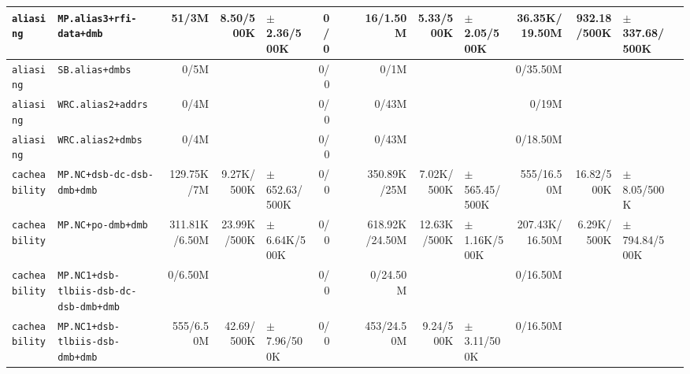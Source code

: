 \begin{tabular}{l l  | r r l | r r l | r r l | r r l l}
       \verb|aliasing| &                              \verb|MP.alias3+rfi-data+dmb| &          51/3M &             8.50/500K &   $\pm$ 2.36/500K &            0/0 &                       &  &       16/1.50M &             5.33/500K &   $\pm$ 2.05/500K &  36.35K/19.50M &           932.18/500K & $\pm$ 337.68/500K & \\ \hline 
       \verb|aliasing| &                                       \verb|SB.alias+dmbs| &           0/5M &                       &                   &            0/0 &                       &  &           0/1M &                       &                   &       0/35.50M &                       &                   & \\ \hline 
       \verb|aliasing| &                                    \verb|WRC.alias2+addrs| &           0/4M &                       &                   &            0/0 &                       &  &          0/43M &                       &                   &          0/19M &                       &                   & \\ \hline 
       \verb|aliasing| &                                     \verb|WRC.alias2+dmbs| &           0/4M &                       &                   &            0/0 &                       &  &          0/43M &                       &                   &       0/18.50M &                       &                   & \\ \hline 
   \verb|cacheability| &                            \verb|MP.NC+dsb-dc-dsb-dmb+dmb| &     129.75K/7M &            9.27K/500K & $\pm$ 652.63/500K &            0/0 &                       &  &    350.89K/25M &            7.02K/500K & $\pm$ 565.45/500K &     555/16.50M &            16.82/500K &   $\pm$ 8.05/500K & \\ \hline 
   \verb|cacheability| &                                    \verb|MP.NC+po-dmb+dmb| &  311.81K/6.50M &           23.99K/500K &  $\pm$ 6.64K/500K &            0/0 &                       &  & 618.92K/24.50M &           12.63K/500K &  $\pm$ 1.16K/500K & 207.43K/16.50M &            6.29K/500K & $\pm$ 794.84/500K & \\ \hline 
   \verb|cacheability| &                \verb|MP.NC1+dsb-tlbiis-dsb-dc-dsb-dmb+dmb| &        0/6.50M &                       &                   &            0/0 &                       &  &       0/24.50M &                       &                   &       0/16.50M &                       &                   & \\ \hline 
   \verb|cacheability| &                       \verb|MP.NC1+dsb-tlbiis-dsb-dmb+dmb| &      555/6.50M &            42.69/500K &   $\pm$ 7.96/500K &            0/0 &                       &  &     453/24.50M &             9.24/500K &   $\pm$ 3.11/500K &       0/16.50M &                       &                   & \\ \hline 

\end{tabular}
